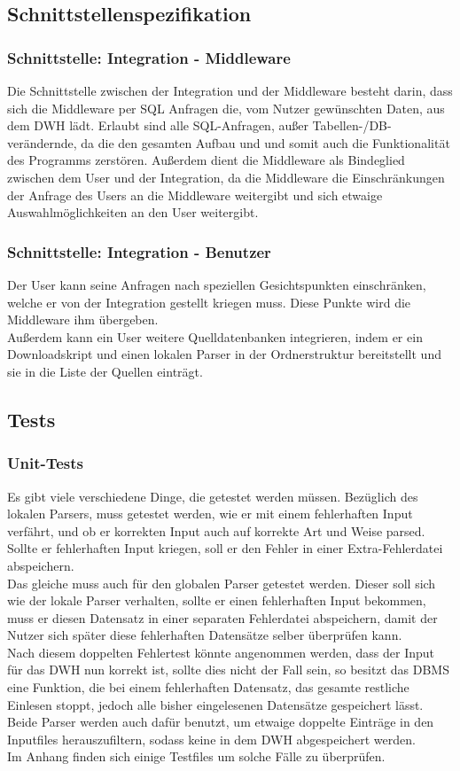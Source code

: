 \subsection{Schnittstellenspezifikation}
\subsubsection{Schnittstelle: Integration - Middleware}
Die Schnittstelle zwischen der Integration und der Middleware besteht darin, dass sich die Middleware per SQL Anfragen die, vom Nutzer gewünschten Daten, aus dem DWH lädt. Erlaubt sind alle SQL-Anfragen, außer Tabellen-/DB-verändernde, da die den gesamten Aufbau und und somit auch die Funktionalität des Programms zerstören. Außerdem dient die Middleware als Bindeglied zwischen dem User und der Integration, da die Middleware die Einschränkungen der Anfrage des Users an die Middleware weitergibt und sich etwaige Auswahlmöglichkeiten an den User weitergibt.
\subsubsection{Schnittstelle: Integration - Benutzer}
Der User kann seine Anfragen nach speziellen Gesichtspunkten einschränken, welche er von der Integration gestellt kriegen muss. Diese Punkte wird die Middleware ihm übergeben.\\
Außerdem kann ein User weitere Quelldatenbanken integrieren, indem er ein Downloadskript und einen lokalen Parser in der Ordnerstruktur bereitstellt und sie in die Liste der Quellen einträgt.\\
\subsection{Tests}
\subsubsection{Unit-Tests}
Es gibt viele verschiedene Dinge, die getestet werden müssen. Bezüglich des lokalen Parsers, muss getestet werden, wie er  mit einem fehlerhaften Input verfährt, und ob er korrekten Input auch auf korrekte Art und Weise parsed. Sollte er fehlerhaften Input kriegen, soll er den Fehler in einer Extra-Fehlerdatei abspeichern.\\
Das gleiche muss auch für den globalen Parser getestet werden. Dieser soll sich wie der lokale Parser verhalten, sollte er einen fehlerhaften Input bekommen, muss er diesen Datensatz in einer separaten Fehlerdatei abspeichern, damit der Nutzer sich später diese fehlerhaften Datensätze selber überprüfen kann.\\
Nach diesem doppelten Fehlertest könnte angenommen werden, dass der Input für das DWH nun korrekt ist, sollte dies nicht der Fall sein, so besitzt das DBMS eine Funktion, die bei einem fehlerhaften Datensatz, das gesamte restliche Einlesen stoppt, jedoch alle bisher eingelesenen Datensätze gespeichert lässt.\\
Beide Parser werden auch dafür benutzt, um etwaige doppelte Einträge in den Inputfiles herauszufiltern, sodass keine in dem DWH abgespeichert werden.\\
Im Anhang finden sich einige Testfiles um solche Fälle zu überprüfen.
